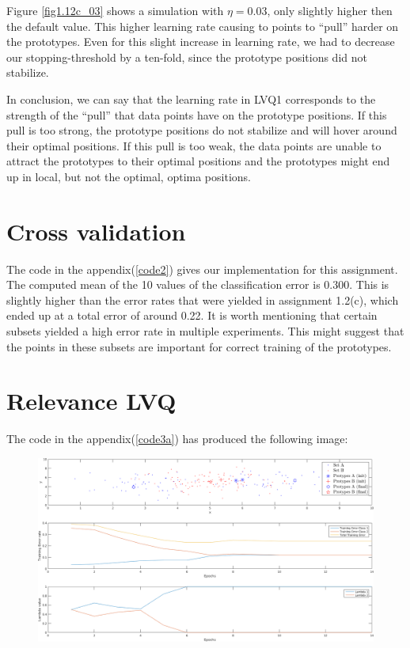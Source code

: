 \documentclass[10pt]{article}
\begin{document}
Figure \ref{fig1.12c_03} shows a simulation with $\eta=0.03$, only slightly higher then the default value.
This higher learning rate causing to points to ``pull'' harder on the prototypes. 
Even for this slight increase in learning rate, we had to decrease our stopping-threshold by a ten-fold, since the prototype positions did not stabilize.

In conclusion, we can say that the learning rate in LVQ1 corresponds to the strength of the ``pull'' that data points have on the prototype positions.
If this pull is too strong, the prototype positions do not stabilize and will hover around their optimal positions.
If this pull is too weak, the data points are unable to attract the prototypes to their optimal positions and 
the prototypes might end up in local, but not the optimal, optima positions.



\section{Cross validation}
The code in the appendix(\autoref{code2}) gives our implementation for this assignment. The computed mean of the 10 values of the classification error is 0.300. This is slightly higher than the error rates that were yielded in assignment 1.2(c), which ended up at a total error of around 0.22. 
It is worth mentioning that certain subsets yielded a high error rate in multiple experiments.
This might suggest that the points in these subsets are important for correct training of the prototypes.

\section{Relevance LVQ}
The code in the appendix(\autoref{code3a}) has produced the following image:
\begin{figure}[H]
 \centering
 \includegraphics[width=\textwidth]{Fig3a.png}
 \caption{}
 \label{fig3a}
\end{figure}
\end{document}
